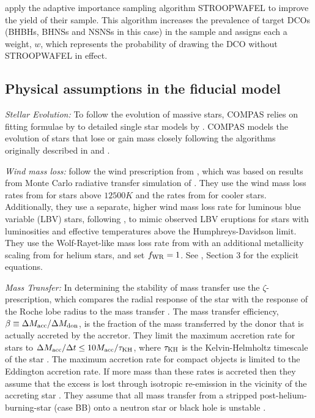\citet{Broekgaarden+2021,Broekgaarden+2021b} apply the adaptive importance sampling algorithm STROOPWAFEL \citep{Broekgaarden+2019} to improve the yield of their sample. This algorithm increases the prevalence of target DCOs (BHBHs, BHNSs and NSNSs in this case) in the sample and assigns each a weight, $w$, which represents the probability of drawing the DCO without STROOPWAFEL in effect.

\subsection{Physical assumptions in the fiducial model}\label{app:fiducial_physics}

\textit{Stellar Evolution:} To follow the evolution of massive stars, COMPAS relies on fitting formulae by \citet{Hurley+2000} to detailed single star models by \citet{Pols+1998}. COMPAS models the evolution of stars that lose or gain mass closely following the algorithms originally described in \citet{Tout+1996} and \citet{Hurley+2002}.

\textit{Wind mass loss:} \citet{Broekgaarden+2021,Broekgaarden+2021b} follow the wind prescription from \citet{Belczynski+2008}, which was based on results from Monte Carlo radiative transfer simulation of \citet{Vink+2000, Vink+2001}. They use the wind mass loss rates from \citet{Vink+2001} for stars above $12500 \unit{K}$ and the rates from \citet{Hurley+2000} for cooler stars. Additionally, they use a separate, higher wind mass loss rate for luminous blue variable (LBV) stars, following \citet{Belczynski+2008}, to mimic observed LBV eruptions for stars with luminosities and effective temperatures above the Humphreys-Davidson limit. They use the Wolf-Rayet-like mass loss rate from \citet{Hamann+1998} with an additional metallicity scaling from \citet{Vink+2005} for helium stars, and set $f_{\rm WR} = 1$. See \citet{COMPAS:2021methodsPaper}, Section 3 for the explicit equations.

\textit{Mass Transfer:} In determining the stability of mass transfer \citet{Broekgaarden+2021,Broekgaarden+2021b} use the $\zeta$-prescription, which compares the radial response of the star with the response of the Roche lobe radius to the mass transfer \citep[e.g.][]{Hjellming+1987}. The mass transfer efficiency, $\beta \equiv \Delta M_{\rm acc} / \Delta M_{\rm don}$, is the fraction of the mass transferred by the donor that is actually accreted by the accretor. They limit the maximum accretion rate for stars to $\Delta M_{\rm acc} / \Delta t \le 10 M_{\rm acc} / \tau_{\rm KH}$, where $\tau_{\rm KH}$ is the Kelvin-Helmholtz timescale of the star \citep{Paczynski+1972, Hurley+2002}. The maximum accretion rate for compact objects is limited to the Eddington accretion rate. If more mass than these rates is accreted then they assume that the excess is lost through isotropic re-emission in the vicinity of the accreting star \citep[e.g.][]{Massevitch+1975, Soberman+1997}. They assume that all mass transfer from a stripped post-helium-burning-star (case BB) onto a neutron star or black hole is unstable \citep{Tauris+2015}.

